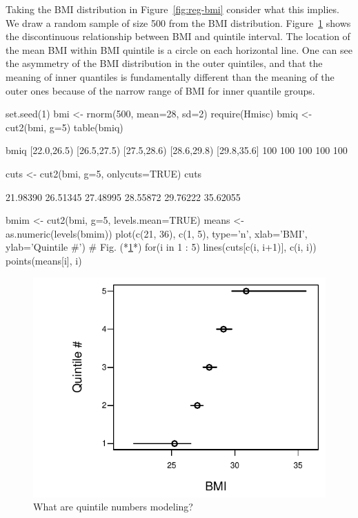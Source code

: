 Taking the BMI distribution in Figure~\ref{fig:reg-bmi} consider what
this implies.  We draw a random sample of size 500 from
the BMI distribution.  Figure~\ref{fig:reg-bmiq} shows the
discontinuous relationship between BMI and quintile interval.  The
location of the mean BMI within BMI quintile is a circle on each
horizontal line.  One can see the asymmetry of the BMI distribution
in the outer quintiles, and that the meaning of inner quantiles is
fundamentally different than the meaning of the outer ones because of
the narrow range of BMI for inner quantile groups.
\begin{Schunk}
\begin{Sinput}
set.seed(1)
bmi  <- rnorm(500, mean=28, sd=2)
require(Hmisc)
bmiq <- cut2(bmi, g=5)
table(bmiq)
\end{Sinput}
\begin{Soutput}
bmiq
[22.0,26.5) [26.5,27.5) [27.5,28.6) [28.6,29.8) [29.8,35.6] 
        100         100         100         100         100 
\end{Soutput}
\begin{Sinput}
cuts <- cut2(bmi, g=5, onlycuts=TRUE)
cuts
\end{Sinput}
\begin{Soutput}
[1] 21.98390 26.51345 27.48995 28.55872 29.76222 35.62055
\end{Soutput}
\begin{Sinput}
bmim <- cut2(bmi, g=5, levels.mean=TRUE)
means <- as.numeric(levels(bmim))
plot(c(21, 36), c(1, 5), type='n', xlab='BMI', ylab='Quintile #')   # Fig. (*\ref{fig:reg-bmiq}*)
for(i in 1 : 5) {
  lines(cuts[c(i, i+1)], c(i, i))
  points(means[i], i)
}
\end{Sinput}
\begin{figure}[htbp]

\centerline{\includegraphics{reg-bmiq-1} }

\caption[What are quintile numbers modeling?]{What are quintile numbers modeling?}\label{fig:reg-bmiq}
\end{figure}
\end{Schunk}

